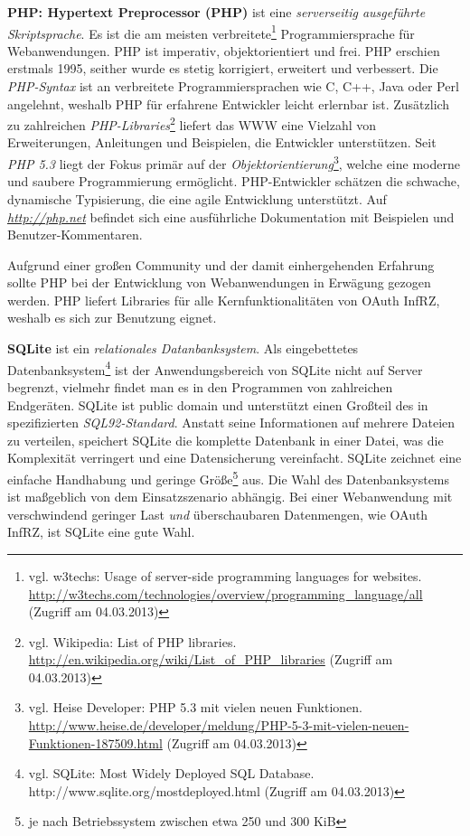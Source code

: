 \documentclass[12pt,a4paper,pointednumbers,abstracton]{scrartcl}
\begin{document}
\textbf{PHP: Hypertext Preprocessor (PHP)} ist eine \emph{serverseitig ausgeführte Skriptsprache}.
Es ist die am meisten verbreitete\footnote{vgl. w3techs: Usage of server-side programming languages for websites. \url{http://w3techs.com/technologies/overview/programming_language/all} (Zugriff am 04.03.2013)} Programmiersprache für Webanwendungen.
PHP ist imperativ, objektorientiert und frei.
PHP erschien erstmals 1995, seither wurde es stetig korrigiert, erweitert und verbessert.
Die \emph{PHP-Syntax} ist an verbreitete Programmiersprachen wie C, C++, Java oder Perl angelehnt, weshalb PHP für erfahrene Entwickler leicht erlernbar ist.
Zusätzlich zu zahlreichen \emph{PHP-Libraries}\footnote{vgl. Wikipedia: List of PHP libraries. \url{http://en.wikipedia.org/wiki/List_of_PHP_libraries} (Zugriff am 04.03.2013)} liefert  das WWW eine Vielzahl von Erweiterungen, Anleitungen und Beispielen, die Entwickler unterstützen.
Seit \emph{PHP 5.3} liegt der Fokus primär auf der \emph{Objektorientierung}\footnote{vgl. Heise Developer: PHP 5.3 mit vielen neuen Funktionen. \url{http://www.heise.de/developer/meldung/PHP-5-3-mit-vielen-neuen-Funktionen-187509.html} (Zugriff am 04.03.2013)}, welche eine moderne und saubere Programmierung ermöglicht.
PHP-Entwickler schätzen die schwache, dynamische Typisierung, die eine agile Entwicklung unterstützt.
Auf \emph{\url{http://php.net}} befindet sich eine ausführliche Dokumentation mit Beispielen und Benutzer-Kommentaren.

Aufgrund einer großen Community und der damit einhergehenden Erfahrung sollte PHP bei der Entwicklung von Webanwendungen in Erwägung gezogen werden.
PHP liefert Libraries für alle Kernfunktionalitäten von OAuth InfRZ, weshalb es sich zur Benutzung eignet.

\textbf{SQLite} ist ein \emph{relationales Datanbanksystem}.
Als eingebettetes Datenbanksystem\footnote{vgl. SQLite: Most Widely Deployed SQL Database. http://www.sqlite.org/mostdeployed.html (Zugriff am 04.03.2013)} ist der Anwendungsbereich von SQLite nicht auf Server begrenzt, vielmehr findet man es in den Programmen von zahlreichen Endgeräten.
SQLite ist public domain und unterstützt einen Großteil des in \cite{SQL1992} spezifizierten \emph{SQL92-Standard}.
Anstatt seine Informationen auf mehrere Dateien zu verteilen, speichert SQLite die komplette Datenbank in einer Datei, was die Komplexität verringert und eine Datensicherung vereinfacht.
SQLite zeichnet eine einfache Handhabung und geringe Größe\footnote{je nach Betriebssystem zwischen etwa 250 und 300 KiB} aus.
Die Wahl des Datenbanksystems ist maßgeblich von dem Einsatzszenario abhängig. Bei einer Webanwendung mit verschwindend geringer Last \emph{und} überschaubaren Datenmengen, wie OAuth InfRZ, ist SQLite eine gute Wahl.
\end{document}
